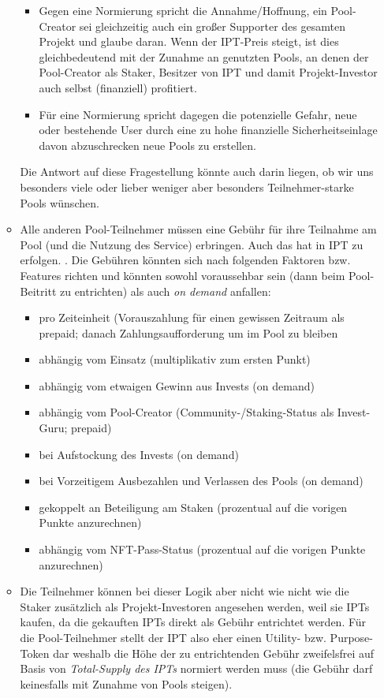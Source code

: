 \begin{itemize}
\begin{itemize}
  	\begin{itemize}
  		\item Gegen eine Normierung spricht die Annahme/Hoffnung, ein Pool-Creator sei gleichzeitig auch ein großer Supporter des gesamten Projekt und glaube daran. Wenn der IPT-Preis steigt, ist dies gleichbedeutend mit der Zunahme an genutzten Pools, an denen der Pool-Creator als Staker, Besitzer von IPT und damit Projekt-Investor auch selbst (finanziell) profitiert.
  		\item Für eine Normierung spricht dagegen die potenzielle Gefahr, neue oder bestehende User durch eine zu hohe finanzielle Sicherheitseinlage davon abzuschrecken neue Pools zu erstellen.
  	\end{itemize}
  	Die Antwort auf diese Fragestellung könnte auch darin liegen, ob wir uns besonders viele oder lieber weniger aber besonders Teilnehmer-starke Pools wünschen.	
  	\item Alle anderen Pool-Teilnehmer müssen eine Gebühr für ihre Teilnahme am Pool (und die Nutzung des Service) erbringen. Auch das hat in IPT zu erfolgen. . Die Gebühren könnten sich nach folgenden Faktoren bzw. Features richten und könnten sowohl voraussehbar sein (dann beim Pool-Beitritt zu entrichten) als auch \textit{on demand} anfallen:
  	\begin{itemize}
  		\item pro Zeiteinheit (Vorauszahlung für einen gewissen Zeitraum als prepaid; danach Zahlungsaufforderung um im Pool zu bleiben
  		\item abhängig vom Einsatz (multiplikativ zum ersten Punkt)
  		\item abhängig vom etwaigen Gewinn aus Invests (on demand)
  		\item abhängig vom Pool-Creator (Community-/Staking-Status als Invest-Guru; prepaid)
  		\item bei Aufstockung des Invests (on demand)
  		\item bei Vorzeitigem Ausbezahlen und Verlassen des Pools (on demand)
  		\item gekoppelt an Beteiligung am Staken (prozentual auf die vorigen Punkte anzurechnen)
  		\item abhängig vom NFT-Pass-Status (prozentual auf die vorigen Punkte anzurechnen)
  	\end{itemize} 
  	\item Die Teilnehmer können bei dieser Logik aber nicht wie nicht wie die Staker zusätzlich als Projekt-Investoren angesehen werden, weil sie IPTs kaufen, da die gekauften IPTs direkt als Gebühr entrichtet werden. Für die Pool-Teilnehmer stellt der IPT also eher einen Utility- bzw. Purpose-Token dar weshalb die Höhe der zu entrichtenden Gebühr zweifelsfrei auf Basis von \textit{Total-Supply des IPTs} normiert werden muss (die Gebühr darf keinesfalls mit Zunahme von Pools steigen).

\end{itemize}
\end{itemize}
